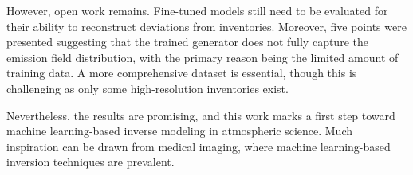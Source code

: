 However, open work remains.
Fine-tuned models still need to be evaluated for their ability to reconstruct deviations from inventories.
Moreover, five points were presented suggesting that the trained generator does not fully capture the emission field distribution, with the primary reason being the limited amount of training data.
A more comprehensive dataset is essential, though this is challenging as only some high-resolution inventories exist.

Nevertheless, the results are promising, and this work marks a first step toward machine learning-based inverse modeling in atmospheric science.
Much inspiration can be drawn from medical imaging, where machine learning-based inversion techniques are prevalent.

